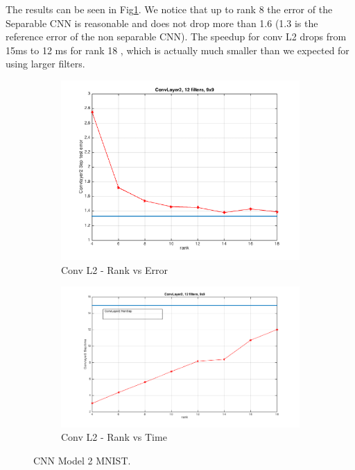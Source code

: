 The results can be seen in Fig\ref{fig:cnn2error}. We notice that up to rank 8 the error of the Separable CNN is reasonable and does not drop more than 1.6 (1.3 is the reference error of the non separable CNN). The speedup for conv L2 drops from 15ms to 12 ms for rank 18 , which is actually much smaller than we expected for using larger filters.
\begin{figure}[h!]
  \centering
  \begin{subfigure}[b]{0.40\textwidth}
   \includegraphics[width=\textwidth]{presentation_plots/convL2_error.png}
    \caption{Conv L2 - Rank vs Error}
  \end{subfigure}
  \begin{subfigure}[b]{0.40\textwidth}
    \includegraphics[width=\textwidth]{presentation_plots/convL2_time.png}
    \caption{Conv L2 - Rank vs Time}
  \end{subfigure}
  \caption{CNN Model 2 MNIST.}
  \label{fig:cnn2error}
\end{figure}

